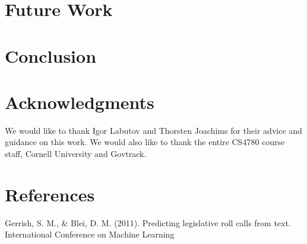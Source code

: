 \documentclass[11pt,letterpaper,twocolumn]{article}
\begin{document}
\section{Future Work}

\section{Conclusion}

\section*{Acknowledgments}

We would like to thank Igor Labutov and Thorsten Joachims for their advice and guidance on this work. We would also like to thank the entire CS4780 course staff, Cornell University and Govtrack. 

\pagebreak

\section*{References}

Gerrish, S. M., \& Blei, D. M. (2011). Predicting legislative roll calls from text. International Conference on Machine Learning
\end{document}
